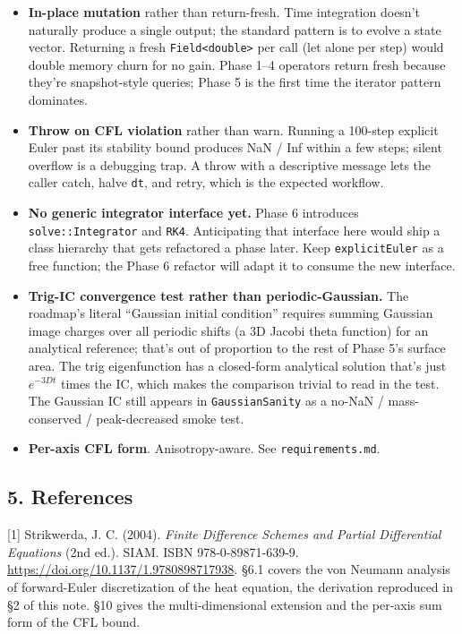 \begin{itemize}
\tightlist
\item
  \textbf{In-place mutation} rather than return-fresh. Time integration
  doesn't naturally produce a single output; the standard pattern is to
  evolve a state vector. Returning a fresh
  \passthrough{\lstinline!Field<double>!} per call (let alone per step)
  would double memory churn for no gain. Phase 1--4 operators return
  fresh because they're snapshot-style queries; Phase 5 is the first
  time the iterator pattern dominates.
\item
  \textbf{Throw on CFL violation} rather than warn. Running a 100-step
  explicit Euler past its stability bound produces NaN / Inf within a
  few steps; silent overflow is a debugging trap. A throw with a
  descriptive message lets the caller catch, halve
  \passthrough{\lstinline!dt!}, and retry, which is the expected
  workflow.
\item
  \textbf{No generic integrator interface yet.} Phase 6 introduces
  \passthrough{\lstinline!solve::Integrator!} and
  \passthrough{\lstinline!RK4!}. Anticipating that interface here would
  ship a class hierarchy that gets refactored a phase later. Keep
  \passthrough{\lstinline!explicitEuler!} as a free function; the Phase
  6 refactor will adapt it to consume the new interface.
\item
  \textbf{Trig-IC convergence test rather than periodic-Gaussian.} The
  roadmap's literal ``Gaussian initial condition'' requires summing
  Gaussian image charges over all periodic shifts (a 3D Jacobi theta
  function) for an analytical reference; that's out of proportion to the
  rest of Phase 5's surface area. The trig eigenfunction has a
  closed-form analytical solution that's just \(e^{-3 D t}\) times the
  IC, which makes the comparison trivial to read in the test. The
  Gaussian IC still appears in \passthrough{\lstinline!GaussianSanity!}
  as a no-NaN / mass-conserved / peak-decreased smoke test.
\item
  \textbf{Per-axis CFL form}. Anisotropy-aware. See
  \passthrough{\lstinline!requirements.md!}.
\end{itemize}

\subsection{5. References}\label{references}

{[}1{]} Strikwerda, J. C. (2004). \emph{Finite Difference Schemes and
Partial Differential Equations} (2nd ed.). SIAM. ISBN 978-0-89871-639-9.
\url{https://doi.org/10.1137/1.9780898717938}. §6.1 covers the von
Neumann analysis of forward-Euler discretization of the heat equation,
the derivation reproduced in §2 of this note. §10 gives the
multi-dimensional extension and the per-axis sum form of the CFL bound.

